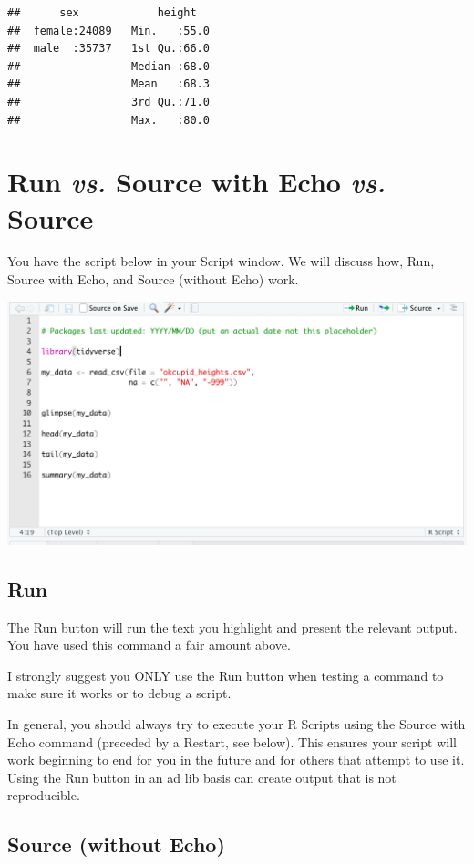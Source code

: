 \documentclass[
]{krantz}
\begin{document}
\begin{verbatim}
##      sex            height    
##  female:24089   Min.   :55.0  
##  male  :35737   1st Qu.:66.0  
##                 Median :68.0  
##                 Mean   :68.3  
##                 3rd Qu.:71.0  
##                 Max.   :80.0
\end{verbatim}

\hypertarget{run-vs.-source-with-echo-vs.-source}{%
\section{\texorpdfstring{Run \emph{vs.} Source with Echo \emph{vs.} Source}{Run vs. Source with Echo vs. Source}}\label{run-vs.-source-with-echo-vs.-source}}

You have the script below in your Script window. We will discuss how, Run, Source with Echo, and Source (without Echo) work.

\includegraphics[width=0.5\linewidth,height=0.5\textheight]{first_time/images/script_all}

\hypertarget{run}{%
\subsection{Run}\label{run}}

The Run button will run the text you highlight and present the relevant output. You have used this command a fair amount above.

I strongly suggest you ONLY use the Run button when testing a command to make sure it works or to debug a script.

In general, you should always try to execute your R Scripts using the Source with Echo command (preceded by a Restart, see below). This ensures your script will work beginning to end for you in the future and for others that attempt to use it. Using the Run button in an ad lib basis can create output that is not reproducible.

\hypertarget{source-without-echo}{%
\subsection{Source (without Echo)}\label{source-without-echo}}
\end{document}
